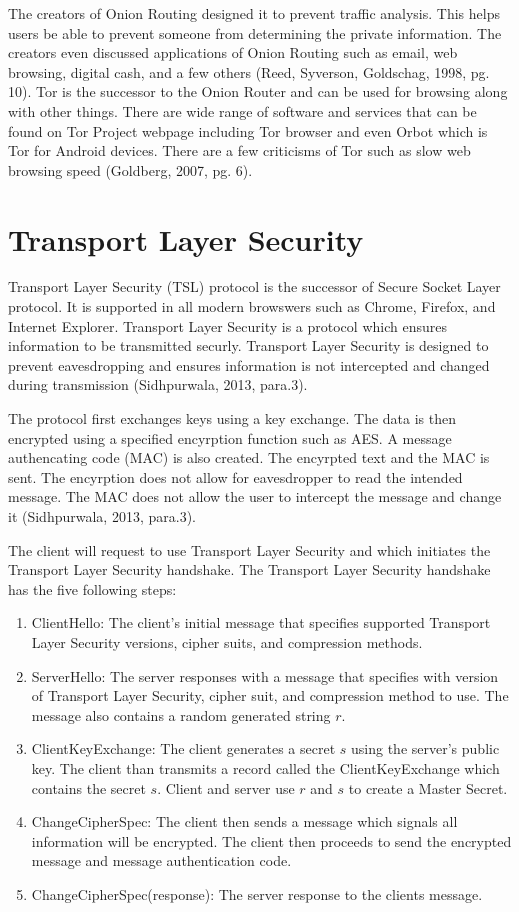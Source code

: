 \documentclass[12pt]{article}
\begin{document}
The creators of Onion Routing designed it to prevent traffic analysis. This helps users be able to prevent someone from determining the private information. The creators even discussed applications of Onion Routing such as email, web browsing, digital cash, and a few others (Reed, Syverson, Goldschag, 1998, pg. 10). Tor is the successor to the Onion Router and can be used for browsing along with other things. There are wide range of software and services that can be found on Tor Project webpage including Tor browser and even Orbot which is Tor for Android devices. There are a few criticisms of Tor such as slow web browsing speed (Goldberg, 2007, pg. 6).


\section{Transport Layer Security}\label{sec:tls}

Transport Layer Security (TSL) protocol is the successor of Secure Socket Layer protocol. It is supported in all modern browswers such as Chrome, Firefox, and Internet Explorer. Transport Layer Security is a protocol which ensures information to be transmitted securly. Transport Layer Security is designed to prevent eavesdropping and ensures information is not intercepted and changed during transmission (Sidhpurwala, 2013, para.3).

The protocol first exchanges keys using a key exchange. The data is then encrypted using a specified encyrption function such as AES. A message authencating code (MAC) is also created. The encyrpted text and the MAC is sent. The encyrption does not allow for eavesdropper to read the intended message. The MAC does not allow the user to intercept the message and change it (Sidhpurwala, 2013, para.3).

The client will request to use Transport Layer Security and which initiates the Transport Layer Security handshake. The Transport Layer Security handshake has the five following steps:
\begin{enumerate}
	\item ClientHello: The client's initial message that specifies supported Transport Layer Security versions, cipher suits, and compression methods. 
	\item ServerHello: The server responses with a message that specifies with version of Transport Layer Security, cipher suit, and compression method to use. The message also contains a random generated string $r$.
	\item ClientKeyExchange: The client generates a secret $s$ using the server's public key. The client than transmits a record called the ClientKeyExchange which contains the secret $s$. Client and server use $r$ and $s$ to create a Master Secret. 
	\item ChangeCipherSpec: The client then sends a message which signals all information will be encrypted. The client then proceeds to send the encrypted message and message authentication code. 
	\item ChangeCipherSpec(response): The server response to the clients message.
\end{enumerate}
\end{document}
